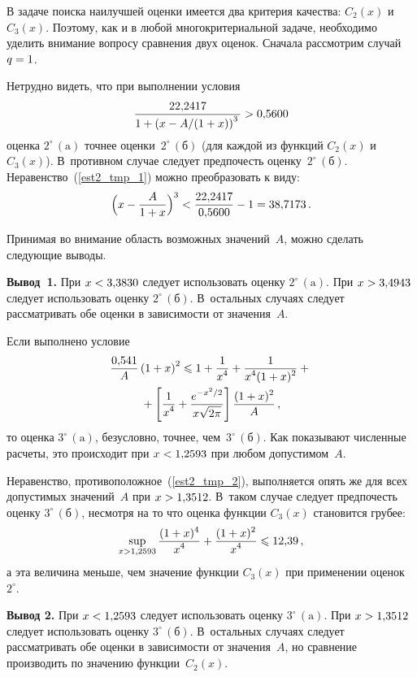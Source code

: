 \begin{multicols}{2}
В задаче поиска наилучшей оценки имеется два критерия качества:
$C_2(x)$ и $C_3(x)$. Поэтому, как и в любой многокритериальной
задаче, необходимо уделить внимание вопросу сравнения двух оценок.
Сначала рассмотрим случай $q\hm=1$.

Нетрудно видеть, что при выполнении условия
\begin{equation} 
\label{est2_tmp_1}
\displaystyle\frac{\displaystyle 22{,}2417\mathstrut}{\displaystyle 1+\left(x-{A}/(1+x)\right)^3\mathstrut}>0{,}5600
\end{equation}
оценка $2^{\circ}\,(\mathrm{a})$ точнее оценки~$2^{\circ}\,(\mathrm{б})$ (для каждой
из функций $C_2(x)$ и~$C_3(x)$). В~противном случае следует
предпочесть оценку~$2^{\circ}\,(\mathrm{б})$. Неравенство~(\ref{est2_tmp_1}) можно преобразовать к виду:
$$
\Big(x-\displaystyle\frac{\displaystyle A\mathstrut}{\displaystyle 1+x\mathstrut}\Big)^3<\displaystyle\frac{\displaystyle 22{,}2417\mathstrut}{\displaystyle 0{,}5600\mathstrut}-1=38{,}7173\,.
$$

Принимая во внимание область возможных значений~$A$, можно сделать
следующие выводы.

\medskip

\noindent
\textbf{Вывод~1.}
При $x\hm<3{,}3830$ следует использовать оценку $2^{\circ}\,(\mathrm{a})$. При
$x\hm>3{,}4943$ следует использовать оценку $2^{\circ}\,(\mathrm{б})$. 
В~остальных случаях следует рас\-смат\-ри\-вать обе оценки в зависимости
от значения~$A$.

\smallskip

Если выполнено условие
\begin{multline} 
\label{est2_tmp_2}
\displaystyle\frac{\displaystyle 0{,}541\mathstrut}{\displaystyle A\mathstrut} \left(1+x\right)^2\leqslant 1+\displaystyle\frac{\displaystyle 1\mathstrut}{\displaystyle x^4\mathstrut}+\displaystyle\frac{\displaystyle 1\mathstrut}{\displaystyle x^4(1+x)^2\mathstrut}+{}\\
{}+
\left[\displaystyle\frac{\displaystyle 1\mathstrut}{\displaystyle x^4\mathstrut}+\displaystyle\frac{\displaystyle e^{-x^2/2}\mathstrut}{\displaystyle x\sqrt{2\pi}\mathstrut}\right]\displaystyle\frac{\displaystyle (1+x)^2\mathstrut}{\displaystyle A\mathstrut}\,,
\end{multline}
то оценка $3^{\circ}\,(\mathrm{a})$, безусловно, точнее, чем~$3^{\circ}\,(\mathrm{б})$. 
Как показывают численные расчеты, это происходит
при $x\hm<1{,}2593$ при любом допустимом~$A$.

Неравенство, противоположное~(\ref{est2_tmp_2}), выполняется опять
же для всех допустимых значений~$A$ при $x\hm>1{,}3512$. В~таком случае
следует предпочесть оценку $3^{\circ}\,(\mathrm{б})$, несмотря на то что
оценка функции $C_3(x)$ становится грубее:
$$
\sup\limits_{x>1{,}2593}\displaystyle\frac{\displaystyle (1+x)^4\mathstrut}{\displaystyle x^4\mathstrut}+\displaystyle\frac{\displaystyle (1+x)^2\mathstrut}{\displaystyle x^4\mathstrut}\leqslant 12{,}39\,,
$$
а эта величина меньше, чем значение функции $C_3(x)$ при
применении оценок~$2^\circ$.

\medskip

\noindent
\textbf{Вывод 2.}
При $x\hm<1{,}2593$ следует использовать оценку $3^{\circ}\,(\mathrm{a})$. При
$x\hm>1{,}3512$ следует использовать оценку $3^{\circ}\,(\mathrm{б})$. 
В~остальных случаях следует рассматривать обе оценки в зависимости
от значения~$A$, но сравнение производить по значению функции~$C_2(x)$.


\end{multicols}
